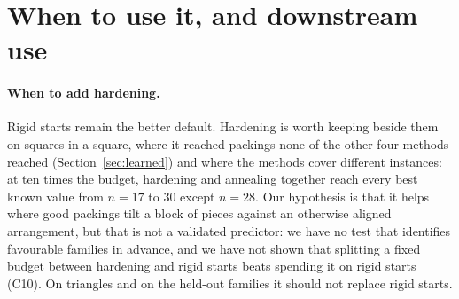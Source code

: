 \section{When to use it, and downstream use}\label{sec:matters}
\paragraph{When to add hardening.} Rigid starts remain the better default. Hardening is worth keeping beside them on squares in a square, where it reached packings none of the other four methods reached (Section~\ref{sec:learned}) and where the methods cover different instances: at ten times the budget, hardening and annealing together reach every best known value from $n=17$ to 30 except $n=28$. Our hypothesis is that it helps where good packings tilt a block of pieces against an otherwise aligned arrangement, but that is not a validated predictor: we have no test that identifies favourable families in advance, and we have not shown that splitting a fixed budget between hardening and rigid starts beats spending it on rigid starts (C10). On triangles and on the held-out families it should not replace rigid starts.

